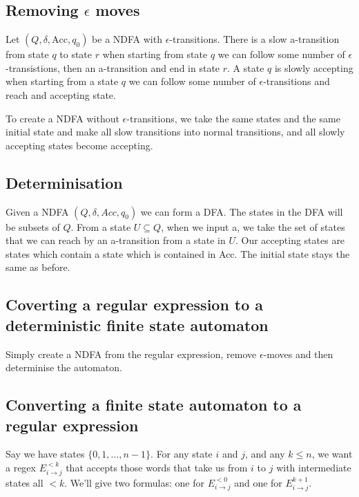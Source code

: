 \documentclass[11pt]{article}
\begin{document}
	\subsection{Removing $\epsilon$ moves}
	Let $(Q, \delta, \text{Acc}, q_{0})$ be a NDFA with $\epsilon$-transitions. There is a slow a-transition from state $q$ to state $r$ when starting from state $q$ we can follow some number of $\epsilon$-transistions, then an a-transition and end in state $r$. A state $q$ is slowly accepting when starting from a state $q$ we can follow some number of $\epsilon$-transitions and reach and accepting state.
	
	\par To create a NDFA without $\epsilon$-transitions, we take the same states and the same initial state and make all slow transitions into normal transitions, and all slowly accepting states become accepting.
	
	\subsection{Determinisation}
	Given a NDFA $(Q, \delta, Acc, q_{0})$ we can form a DFA. The states in the DFA will be subsets of $Q$. From a state $U \subseteq Q$, when we input a, we take the set of states that we can reach by an a-transition from a state in $U$. Our accepting states are states which contain a state which is contained in Acc. The initial state stays the same as before.
	\subsection{Coverting a regular expression to a deterministic finite state automaton}
	Simply create a NDFA from the regular expression, remove $\epsilon$-moves and then determinise the automaton.
	\subsection{Converting a finite state automaton to a regular expression}
	Say we have states $\{0, 1, ..., n - 1\}$. For any state $i$ and $j$, and any $k \leq n$, we want a regex $E^{<k}_{i \rightarrow j}$ that accepts those words that take us from $i$ to $j$ with intermediate states all $<k$. We'll give two formulas: one for $E^{<0}_{i \rightarrow j}$ and one for $E^{k+1}_{i \rightarrow j}$.
	
\end{document}
